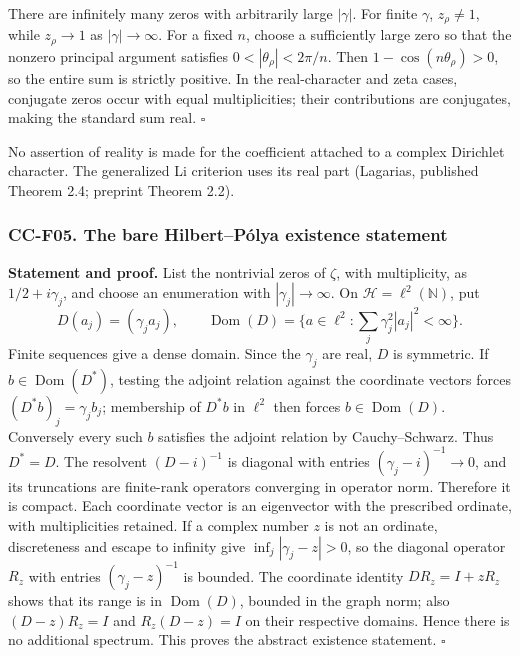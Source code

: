 There are infinitely many zeros with arbitrarily large \(|\gamma|\). For
finite \(\gamma\), \(z_\rho\ne1\), while \(z_\rho\to1\) as
\(|\gamma|\to\infty\). For a fixed \(n\), choose a sufficiently large
zero so that the nonzero principal argument satisfies
\(0<|\theta_\rho|<2\pi/n\). Then \(1-\cos(n\theta_\rho)>0\), so the
entire sum is strictly positive. In the real-character and zeta cases,
conjugate zeros occur with equal multiplicities; their contributions are
conjugates, making the standard sum real. \(\square\)

No assertion of reality is made for the coefficient attached to a
complex Dirichlet character. The generalized Li criterion uses its real
part (Lagarias, published Theorem 2.4; preprint Theorem 2.2).

\subsubsection{CC-F05. The bare Hilbert--Pólya existence
statement}\label{cc-f05.-the-bare-hilbertpuxf3lya-existence-statement}

\textbf{Statement and proof.} List the nontrivial zeros of \(\zeta\),
with multiplicity, as \(1/2+i\gamma_j\), and choose an enumeration with
\(|\gamma_j|\to\infty\). On \(\mathcal H=\ell^2(\mathbb N)\), put \[
 D(a_j)=(\gamma_j a_j),\qquad
 \operatorname{Dom}(D)=\{a\in\ell^2:\sum_j\gamma_j^2|a_j|^2<\infty\}.
\] Finite sequences give a dense domain. Since the \(\gamma_j\) are
real, \(D\) is symmetric. If \(b\in\operatorname{Dom}(D^*)\), testing
the adjoint relation against the coordinate vectors forces
\((D^*b)_j=\gamma_jb_j\); membership of \(D^*b\) in \(\ell^2\) then
forces \(b\in\operatorname{Dom}(D)\). Conversely every such \(b\)
satisfies the adjoint relation by Cauchy--Schwarz. Thus \(D^*=D\). The
resolvent \((D-i)^{-1}\) is diagonal with entries
\((\gamma_j-i)^{-1}\to0\), and its truncations are finite-rank operators
converging in operator norm. Therefore it is compact. Each coordinate
vector is an eigenvector with the prescribed ordinate, with
multiplicities retained. If a complex number \(z\) is not an ordinate,
discreteness and escape to infinity give \(\inf_j|\gamma_j-z|>0\), so
the diagonal operator \(R_z\) with entries \((\gamma_j-z)^{-1}\) is
bounded. The coordinate identity \(DR_z=I+zR_z\) shows that its range is
in \(\operatorname{Dom}(D)\), bounded in the graph norm; also
\((D-z)R_z=I\) and \(R_z(D-z)=I\) on their respective domains. Hence
there is no additional spectrum. This proves the abstract existence
statement. \(\square\)

